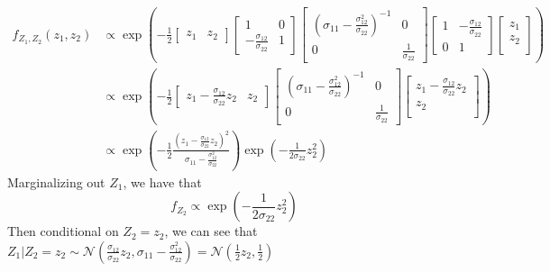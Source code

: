 \documentclass{article}
\DeclareMathOperator*{\1}{\mathbbm{1}}
\newcommand{\cN}{\mathcal{N}}
\theoremstyle{definition}
\theoremstyle{remark}
\begin{document}
    \begin{align*}
      f_{Z_1,Z_2}(z_1,z_2)&\propto \exp\left(-\frac{1}{2}
      \begin{bmatrix}
        z_1 & z_2
        \end{bmatrix}
      \begin{bmatrix}
        1 & 0\\
        -\frac{\sigma_{12}}{\sigma_{22}} & 1
        \end{bmatrix}
        \begin{bmatrix}
          \left(\sigma_{11}-\frac{\sigma_{12}^2}{\sigma_{22}}\right)^{-1} & 0\\
          0& \frac{1}{\sigma_{22}}
          \end{bmatrix}
          \begin{bmatrix}
            1 & -\frac{\sigma_{12}}{\sigma_{22}}\\
            0& 1
            \end{bmatrix}
            \begin{bmatrix}
              z_1 \\
              z_2\\
            \end{bmatrix}\right)\\
            &\propto \exp\left(-\frac{1}{2}\begin{bmatrix}
              z_1-\frac{\sigma_{12}}{\sigma_{22}}z_2 & z_2
              \end{bmatrix}
              \begin{bmatrix}
                \left(\sigma_{11}-\frac{\sigma_{12}^2}{\sigma_{22}}\right)^{-1} & 0\\
                0& \frac{1}{\sigma_{22}}
                \end{bmatrix}
                \begin{bmatrix}
                  z_1-\frac{\sigma_{12}}{\sigma_{22}}z_2 \\
                  z_2\\
                \end{bmatrix}\right)\\
                &\propto \exp\left(-\frac{1}{2}\frac{(z_1-\frac{\sigma_{12}}{\sigma_{22}}z_2)^2}{\sigma_{11}-\frac{\sigma_{12}^2}{\sigma_{22}}}\right)\exp\left(-\frac{1}{2\sigma_{22}}z_2^2\right)
    \end{align*}
    Marginalizing out $Z_1$, we have that
    \begin{equation*}
      f_{Z_2}\propto \exp\left(-\frac{1}{2\sigma_{22}}z_2^2\right)
    \end{equation*}
    Then conditional on $Z_2=z_2$, we can see that $Z_1\vert Z_2=z_2\sim\cN(\frac{\sigma_{12}}{\sigma_{22}}z_2,\sigma_{11}-\frac{\sigma_{12}^2}{\sigma_{22}})=\cN(\frac{1}{2}z_2,\frac{1}{2})$
\end{document}
